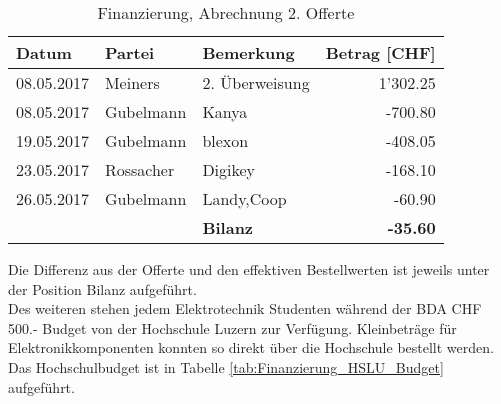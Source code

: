 \begin{table}[H]
	\small
	\centering
	\caption{Finanzierung, Abrechnung 2. Offerte}
	\begin{tabular}{lrlr}
		\hline
		\multicolumn{1}{|l|}{\textbf{Datum}} & \multicolumn{1}{l|}{\textbf{Partei}} & \multicolumn{1}{l|}{\textbf{Bemerkung}} & \multicolumn{1}{l|}{\textbf{Betrag [CHF]}} \\
		\hline
		\multicolumn{1}{|l|}{08.05.2017} & \multicolumn{1}{l|}{Meiners} & \multicolumn{1}{l|}{2. Überweisung} & \multicolumn{1}{r|}{1'302.25} \\
		\hline
		\multicolumn{1}{|l|}{08.05.2017} & \multicolumn{1}{l|}{Gubelmann} & \multicolumn{1}{l|}{Kanya} & \multicolumn{1}{r|}{-700.80} \\
		\hline
		\multicolumn{1}{|l|}{19.05.2017} & \multicolumn{1}{l|}{Gubelmann} & \multicolumn{1}{l|}{blexon} & \multicolumn{1}{r|}{-408.05} \\
		\hline
		\multicolumn{1}{|l|}{23.05.2017} & \multicolumn{1}{l|}{Rossacher} & \multicolumn{1}{l|}{Digikey} & \multicolumn{1}{r|}{-168.10} \\
		\hline
		\multicolumn{1}{|l|}{26.05.2017} & \multicolumn{1}{l|}{Gubelmann} & \multicolumn{1}{l|}{Landy,Coop} & \multicolumn{1}{r|}{-60.90} \\
		\hline
		&       & \textbf{Bilanz} & \textbf{-35.60} \\
	\end{tabular}%
	\label{tab:Finanzierung_Offerte2}%
\end{table}%

Die Differenz aus der Offerte und den effektiven Bestellwerten ist jeweils unter der Position Bilanz aufgeführt.\\
Des weiteren stehen jedem Elektrotechnik Studenten während der BDA CHF 500.- Budget von der Hochschule Luzern zur Verfügung. Kleinbeträge für Elektronikkomponenten konnten so direkt über die Hochschule bestellt werden. Das Hochschulbudget ist in Tabelle \ref{tab:Finanzierung_HSLU_Budget} aufgeführt.

